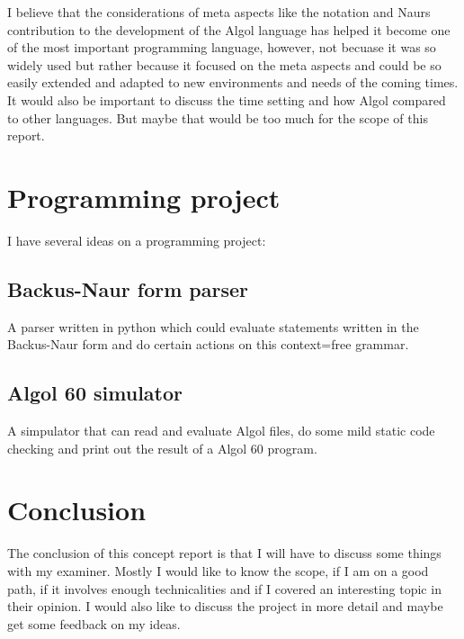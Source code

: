 \documentclass{article}
\begin{document}
I believe that the considerations of meta aspects like the notation and Naurs contribution to the development of the Algol language has helped it become one of the most important programming language, however, not becuase it was so widely used but rather because it focused on the meta aspects and could be so easily extended and adapted to new environments and needs of the coming times. It would also be important to discuss the time setting and how Algol compared to other languages. But maybe that would be too much for the scope of this report.

\section{Programming project}

I have several ideas on a programming project:

\subsection{Backus-Naur form parser}
A parser written in python which could evaluate statements written in the Backus-Naur form and do certain actions on this context=free grammar.

\subsection{Algol 60 simulator}
A simpulator that can read and evaluate Algol files, do some mild static code checking and print out the result of a Algol 60 program.

\section{Conclusion}

The conclusion of this concept report is that I will have to discuss some things with my examiner. Mostly I would like to know the scope, if I am on a good path, if it involves enough technicalities and if I covered an interesting topic in their opinion. I would also like to discuss the project in more detail and maybe get some feedback on my ideas. 


\end{document}
